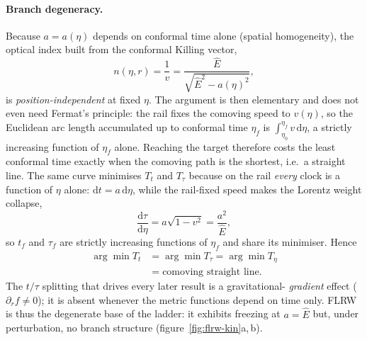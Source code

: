 \documentclass[12pt]{iopart}
\newcommand{\Ehat}{\hat E}
\newcommand{\dd}{\mathrm{d}}
\theoremstyle{plain}
\theoremstyle{definition}
\theoremstyle{plain}
\theoremstyle{remark}
\begin{document}
\paragraph{Branch degeneracy.} Because $a=a(\eta)$ depends on conformal time
alone (spatial homogeneity), the optical index built from the conformal Killing
vector,
\begin{equation}
    n(\eta,r)=\frac1v=\frac{\Ehat}{\sqrt{\Ehat^2-a(\eta)^2}},
    \label{eq:flrwindex}
\end{equation}
is \emph{position-independent} at fixed $\eta$. The argument is then elementary and does
not even need Fermat's principle: the rail fixes the comoving speed to $v(\eta)$, so the
Euclidean arc length accumulated up to conformal time $\eta_f$ is
$\int_{\eta_0}^{\eta_f}v\,\dd\eta$, a strictly increasing function of $\eta_f$ alone.
Reaching the target therefore costs the least conformal time exactly when the comoving
path is the shortest, i.e.\ a straight line. The same curve minimises $T_t$ and $T_\tau$
because on the rail \emph{every} clock is a function of $\eta$ alone: $\dd t=a\,\dd\eta$,
while the rail-fixed speed makes the Lorentz weight collapse,
\begin{equation}
   \frac{\dd\tau}{\dd\eta}=a\sqrt{1-v^2}=\frac{a^2}{\Ehat},
   \label{eq:flrw-dtau}
\end{equation}
so $t_f$ and $\tau_f$ are strictly increasing functions of $\eta_f$ and share its
minimiser. Hence
\begin{equation}
\begin{split}
    \arg\min T_t&=\arg\min T_\tau=\arg\min T_\eta\\
    &=\text{comoving straight line}.
\end{split}
    \label{eq:flrwdegen}
\end{equation}
The $t/\tau$ splitting that drives every later result is a gravitational-%
\emph{gradient} effect ($\partial_r f\neq0$); it is absent whenever the metric
functions depend on time only. FLRW is thus the degenerate base of the ladder:
it exhibits freezing at $a=\Ehat$ but, under perturbation, no branch structure
(figure~\ref{fig:flrw-kin}a,\,b).
\end{document}
